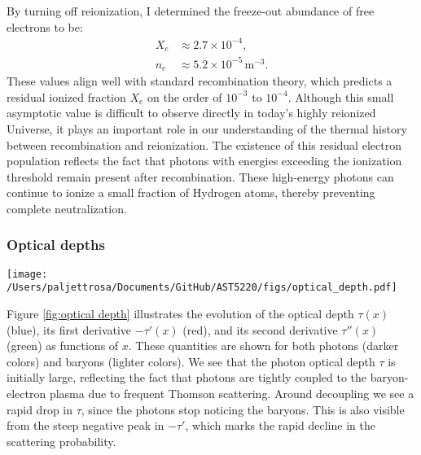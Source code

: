 \documentclass{aa}
\numberwithin{equation}{section}
\numberwithin{table}{section}
\numberwithin{figure}{section}
\begin{document}
By turning off reionization, I determined the freeze-out abundance of free electrons to be:
\begin{align*}
  X_e &\approx 2.7 \times10^{-4},
  \\
  n_e &\approx 5.2 \times10^{-5}\,\text{m}^{-3}.
\end{align*}
These values align well with standard recombination theory, which predicts a residual ionized fraction $X_e$ on the order of $10^{-3}$ to $10^{-4}$. Although this small asymptotic value is difficult to observe directly in today's highly reionized Universe, it plays an important role in our understanding of the thermal history between recombination and reionization. The existence of this residual electron population reflects the fact that photons with energies exceeding the ionization threshold remain present after recombination. These high-energy photons can continue to ionize a small fraction of Hydrogen atoms, thereby preventing complete neutralization.



\subsubsection{Optical depths}

\begin{figure*}
  \centering
  \texttt{[image: /Users/paljettrosa/Documents/GitHub/AST5220/figs/optical\_depth.pdf]}
  \caption{The evolution of the optical depth $\tau$ (blue), its first derivative $-\tau'$ (red), and its second derivative $\tau''$ (green) for both photons (darker lines) and baryons (lighter lines). The bottom left subplot shows the evolutions of these quantities around decoupling and recombination, while the bottom right subplot highlights their changes during the epoch of reionization. The sharp drop in $\tau$ marks photon decoupling, after which photons free-stream. In constrast, the gradual decline in $\tau_b$ indicates the prolonged influence of radiation pressure on baryons during the drag epoch. 
  }\label{fig:optical depth}
\end{figure*}

Figure \ref{fig:optical depth} illustrates the evolution of the optical depth $\tau(x)$ (blue), its first derivative $-\tau'(x)$ (red), and its second derivative $\tau''(x)$ (green) as functions of $x$. These quantities are shown for both photons (darker colors) and baryons (lighter colors). We see that the photon optical depth $\tau$ is initially large, reflecting the fact that photons are tightly coupled to the baryon-electron plasma due to frequent Thomson scattering. Around decoupling we see a rapid drop in $\tau$, since the photons stop noticing the baryons. This is also visible from the steep negative peak in $-\tau'$, which marks the rapid decline in the scattering probability. 
\end{document}
